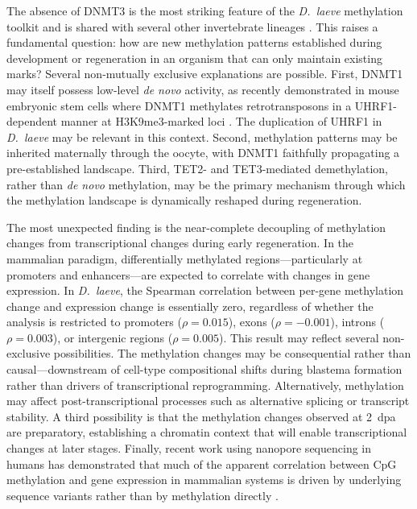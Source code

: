 \documentclass[12pt]{article}
\begin{document}
The absence of DNMT3 is the most striking feature of the \textit{D.\ laeve} methylation toolkit and is shared with several other invertebrate lineages \cite{pongerEvolutionaryDiversificationDNA2005, haidarDNAMethylationMachinery2024}. This raises a fundamental question: how are new methylation patterns established during development or regeneration in an organism that can only maintain existing marks? Several non-mutually exclusive explanations are possible. First, DNMT1 may itself possess low-level \textit{de novo} activity, as recently demonstrated in mouse embryonic stem cells where DNMT1 methylates retrotransposons in a UHRF1-dependent manner at H3K9me3-marked loci \cite{haggertyDnmt1HasNovo2021}. The duplication of UHRF1 in \textit{D.\ laeve} may be relevant in this context. Second, methylation patterns may be inherited maternally through the oocyte, with DNMT1 faithfully propagating a pre-established landscape. Third, TET2- and TET3-mediated demethylation, rather than \textit{de novo} methylation, may be the primary mechanism through which the methylation landscape is dynamically reshaped during regeneration.

The most unexpected finding is the near-complete decoupling of methylation changes from transcriptional changes during early regeneration. In the mammalian paradigm, differentially methylated regions---particularly at promoters and enhancers---are expected to correlate with changes in gene expression. In \textit{D.\ laeve}, the Spearman correlation between per-gene methylation change and expression change is essentially zero, regardless of whether the analysis is restricted to promoters ($\rho = 0.015$), exons ($\rho = -0.001$), introns ($\rho = 0.003$), or intergenic regions ($\rho = 0.005$). This result may reflect several non-exclusive possibilities. The methylation changes may be consequential rather than causal---downstream of cell-type compositional shifts during blastema formation rather than drivers of transcriptional reprogramming. Alternatively, methylation may affect post-transcriptional processes such as alternative splicing or transcript stability. A third possibility is that the methylation changes observed at 2~dpa are preparatory, establishing a chromatin context that will enable transcriptional changes at later stages. Finally, recent work using nanopore sequencing in humans has demonstrated that much of the apparent correlation between CpG methylation and gene expression in mammalian systems is driven by underlying sequence variants rather than by methylation directly \cite{stefanssonCorrelationCpGMethylation2024}.
\end{document}
